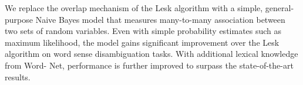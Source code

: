 We replace the overlap mechanism of the Lesk algorithm with a simple, general- purpose Naive Bayes model that measures many-to-many association between two sets of random variables. Even with simple probability estimates such as maximum likelihood, the model gains significant improvement over the Lesk algorithm on word sense disambiguation tasks. With additional lexical knowledge from Word- Net, performance is further improved to surpass the state-of-the-art results.

